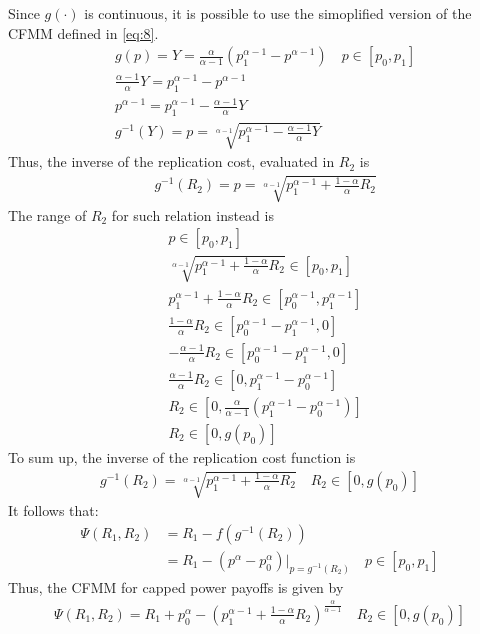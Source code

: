 \documentclass[12pt]{article}
\begin{document}
Since $g(\cdot)$ is continuous, it is possible to use the simoplified version of the CFMM defined in \eqref{eq:8}.
\begin{align*}
     & g(p) = Y = \frac{\alpha}{\alpha-1}(p_1^{\alpha-1}-p^{\alpha-1}) \quad p\in[p_0,p_1] \\
     & \frac{\alpha-1}{\alpha}Y = p_1^{\alpha-1}-p^{\alpha-1}                              \\
     & p^{\alpha-1} = p_1^{\alpha-1} - \frac{\alpha-1}{\alpha}Y                            \\
     & g^{-1}(Y) = p = \sqrt[\alpha-1]{p_1^{\alpha-1} - \frac{\alpha-1}{\alpha}Y}
\end{align*}
Thus, the inverse of the replication cost, evaluated in $R_2$ is
\begin{align*}
     & g^{-1}(R_2) = p = \sqrt[\alpha-1]{p_1^{\alpha-1} + \frac{1-\alpha}{\alpha}R_2}
\end{align*}
The range of $R_2$ for such relation instead is
\begin{align*}
     & p\in[p_0,p_1]                                                                            \\
     & \sqrt[\alpha-1]{p_1^{\alpha-1} + \frac{1-\alpha}{\alpha}R_2} \in [p_0,p_1]               \\
     & p_1^{\alpha-1} + \frac{1-\alpha}{\alpha}R_2 \in [p_0^{\alpha-1},p_1^{\alpha-1}]          \\
     & \frac{1-\alpha}{\alpha}R_2 \in [p_0^{\alpha-1}-p_1^{\alpha-1},0]                         \\
     & -\frac{\alpha-1}{\alpha}R_2 \in [p_0^{\alpha-1}-p_1^{\alpha-1},0]                        \\
     & \frac{\alpha-1}{\alpha}R_2 \in [0,p_1^{\alpha-1}-p_0^{\alpha-1}]                         \\
     & R_2 \in \left[0,\frac{\alpha}{\alpha-1}\left(p_1^{\alpha-1}-p_0^{\alpha-1}\right)\right] \\
     & R_2\in[0,g(p_0)]
\end{align*}
To sum up, the inverse of the replication cost function is
\begin{align*}
    g^{-1}(R_2) = \sqrt[\alpha-1]{p_1^{\alpha-1} + \frac{1-\alpha}{\alpha}R_2} \quad R_2\in[0,g(p_0)]
\end{align*}
It follows that:
\begin{align*}
    \Psi(R_1,R_2) & = R_1 -f(g^{-1}(R_2))                                                \\
                  & = R_1 - (p^\alpha -p_0^\alpha)|_{p=g^{-1}(R_2)} \quad p\in[p_0, p_1]
\end{align*}
Thus, the CFMM for capped power payoffs is given by
\begin{align*}
    \Psi(R_1,R_2) = R_1 +p_0^\alpha - \left(p_1^{\alpha-1} + \frac{1-\alpha}{\alpha}R_2\right)^{\frac{\alpha}{\alpha-1}} \quad R_2\in[0,g(p_0)]
\end{align*}
\newpage
\end{document}
